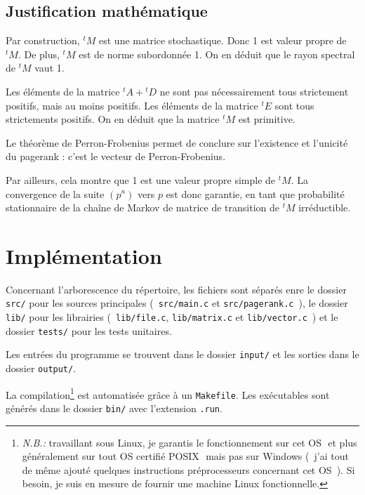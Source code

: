 \documentclass[a4paper,12pt]{article}
\begin{document}
\subsection{Justification mathématique}

Par construction, ${}^t M$ est une matrice stochastique. Donc 1 est valeur propre de ${}^t M$. De plus, ${}^t M$ est de norme subordonnée 1. On en déduit que le rayon spectral de ${}^t M$ vaut 1.

\bigskip

Les éléments de la matrice ${}^t A+{}^t D$ ne sont pas nécessairement tous strictement positifs, mais au moins positifs. Les éléments de la matrice ${}^t E$ sont tous strictements positifs. On en déduit que la matrice ${}^t M$ est primitive.

\bigskip

Le théorème de Perron-Frobenius permet de conclure sur l'existence et l'unicité du pagerank : c'est le vecteur de Perron-Frobenius.

\bigskip

Par ailleurs, cela montre que 1 est une valeur propre simple de ${}^t M$. La convergence de la suite $(p^n)$ vers $p$ est donc garantie, en tant que probabilité stationnaire de la chaîne de Markov de matrice de transition de ${}^t M$ irréductible.

\newpage

\section{Implémentation}

\lstset{style=customc}

Concernant l'arborescence du répertoire, les fichiers sont séparés enre le dossier \texttt{src/} pour les sources principales (~\texttt{src/main.c} et \texttt{src/pagerank.c}~), le dossier \texttt{lib/} pour les librairies (~\texttt{lib/file.c}, \texttt{lib/ma\-trix.c} et \texttt{lib/vector.c}~) et le dossier \texttt{tests/} pour les tests unitaires.

Les entrées du programme se trouvent dans le dossier \texttt{input/} et les sorties dans le dossier \texttt{output/}.

\bigskip

La compilation\footnote{\textit{N.B.:} travaillant sous Linux, je garantis le fonctionnement sur cet OS \textemdash $ $ et plus généralement sur tout OS certifié POSIX \textemdash $ $ mais pas sur Windows (~j'ai tout de même ajouté quelques instructions préprocesseurs concernant cet OS~). Si besoin, je suis en mesure de fournir une machine Linux fonctionnelle.} est automatisée grâce à un \texttt{Makefile}.
Les exécutables sont générés dans le dossier \texttt{bin/} avec l'extension \texttt{.run}.
\end{document}
